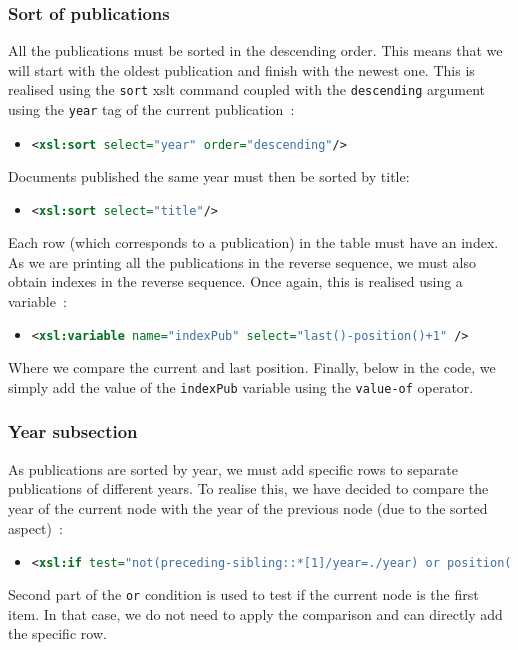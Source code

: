 \documentclass{article}
\begin{document}
    \subsubsection{Sort of publications}
      All the publications must be sorted in the descending order. This means that we will start with the oldest publication and finish with the newest one. This is realised using the \verb|sort| xslt command coupled with the \verb|descending| argument using the \verb|year| tag of the current publication~:
      \begin{itemize}
	\item \begin{lstlisting}[language=XML]
<xsl:sort select="year" order="descending"/>\end{lstlisting}
      \end{itemize}
      Documents published the same year must then be sorted by title:
      \begin{itemize}
	\item \begin{lstlisting}[language=XML]
<xsl:sort select="title"/>\end{lstlisting}
      \end{itemize}
      Each row (which corresponds to a publication) in the table must have an index. As we are printing all the publications in the reverse sequence, we must also obtain indexes in the reverse sequence. Once again, this is realised using a variable~:
      \begin{itemize}
	\item \begin{lstlisting}[language=XML]
<xsl:variable name="indexPub" select="last()-position()+1" />\end{lstlisting}
      \end{itemize}
      Where we compare the current and last position. Finally, below in the code, we simply add the value of the \verb|indexPub| variable using the \verb|value-of| operator. 
      
    \subsubsection{Year subsection}
      As publications are sorted by year, we must add specific rows to separate publications of different years. To realise this, we have decided to compare the year of the current node with the year of the previous node (due to the sorted aspect)~:
      \begin{itemize}
	\item \begin{lstlisting}[language=XML]
<xsl:if test="not(preceding-sibling::*[1]/year=./year) or position()=1">\end{lstlisting}
      \end{itemize}
      Second part of the \verb|or| condition is used to test if the current node is the first item. In that case, we do not need to apply the comparison and can directly add the specific row.
      
\end{document}
